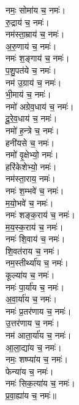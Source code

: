 \begin{multicols}{2}
\begin{flushleft}
नमः॒ सोमा॑य च॒ नमः॑।\\
रु॒द्राय॑ च॒ नमः॑।\\
नम॑स्ता॒म्राय॑ च॒ नमः॑।\\
अ॒रु॒णाय॑ च॒ नमः॑।\\
नमः॑ श॒ङ्गाय॑ च॒ नमः॑।\\
प॒शु॒पत॑ये च॒ नमः॑।\\
नम॑ उ॒ग्राय॑ च॒ नमः॑।\\
भी॒माय॑ च॒ नमः॑।\hfill {}\\
नमो॑ अग्रेव॒धाय॑ च॒ नमः॑।\\
दू॒रे॒व॒धाय॑ च॒ नमः॑।\\
नमो॑ ह॒न्त्रे च॒ नमः॑।\\
हनी॑यसे च॒ नमः॑।\\
नमो॑ वृ॒क्षेभ्यो॒ नमः॑।\\
हरि॑केशेभ्यो॒ नमः॑।\\
नम॑स्ता॒राय॒ नमः॑।\\
नमः॑ श॒म्भवे॑ च॒ नमः॑।\\
म॒यो॒भवे॑ च॒ नमः॑।\\
नमः॑ शङ्क॒राय॑ च॒ नमः॑।\hfill {}\\
म॒य॒स्क॒राय॑ च॒ नमः॑।\\
नमः॑ शि॒वाय॑  च॒ नमः॑।\\
शि॒वत॑राय च॒ नमः॑।\\
नम॒स्तीर्थ्या॑य च॒ नमः॑।\\
कूल्या॑य च॒ नमः॑।\\
नमः॑ पा॒र्या॑य च॒ नमः॑।\\
अ॒वा॒र्या॑य च॒ नमः॑।\\
नमः॑ प्र॒तर॑णाय च॒ नमः॑।\\
उ॒त्तर॑णाय च॒ नमः॑।\\
नम॑ आता॒र्या॑य च॒ नमः॑।\hfill {}\\
आ॒ला॒द्या॑य च॒ नमः॑।\\
नमः॒ शष्प्या॑य च॒ नमः॑।\\
फेन्या॑य च॒ नमः॑।\\
नमः॑ सिक॒त्या॑य च॒ नमः॑।\\
प्र॒वा॒ह्या॑य च॒ नमः॑॥\\


\end{flushleft}
\end{multicols}
